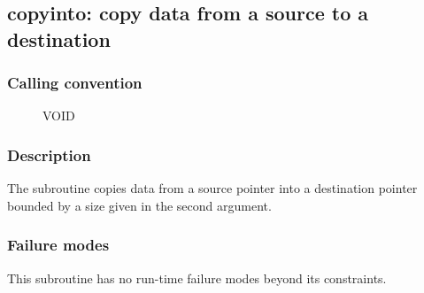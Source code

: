 \clearpage
{}
{}
\label{subr:copyinto}
\subsection*{copyinto: copy data from a source to a destination}

\subsubsection*{Calling convention}

\begin{description}
\item[] VOID
\end{description}

\subsubsection*{Description}

The  subroutine copies data from a source pointer
into a destination pointer bounded by a size given in the second argument.

\subsubsection*{Failure modes}

This subroutine has no run-time failure modes beyond its constraints.
